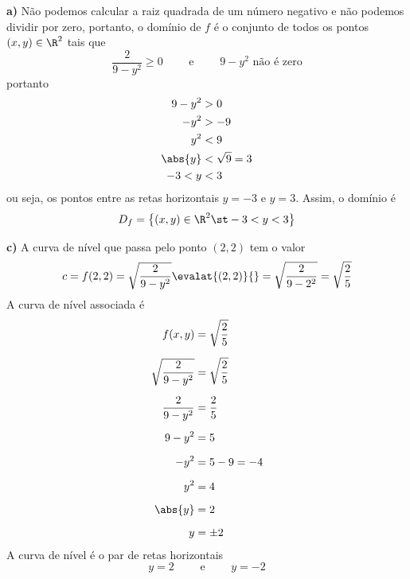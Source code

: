 \documentclass[a4paper,12pt,fleqn]{article}
\begin{document}
\begin{answer}
  \textbf{a)} \quad
  Não podemos calcular a raiz quadrada de um número negativo e não
  podemos dividir por zero, portanto, o domínio de $f$ é o conjunto
  de todos os pontos \((x, y)\in\R^2\) tais que
  \[
    \frac{2}{9 - y^2} \geq 0 \qquad\text{ e }\qquad 9 - y^2 \text{ não é zero}
  \]
  portanto
  \begin{align*}
    9 - y^2 & > 0            \\
    -y^2    & > -9           \\
    y^2     & < 9            \\
    \abs{y} & < \sqrt{9} = 3 \\
    -3 < y  & < 3
  \end{align*}
  ou seja, os pontos entre as retas horizontais \(y=-3\) e \(y=3\).
  Assim, o domínio é
  \[
    D_f = \left\{(x, y) \in \R^2 \st -3 < y < 3 \right\}
  \]

  \bigskip
  \textbf{c)} \quad
  A curva de nível que passa pelo ponto $(2, 2)$ tem o valor
  \[
    c
    = f(2, 2)
    = \sqrt{\frac{2}{9 - y^2}} \evalat{(2, 2)}{}
    = \sqrt{\frac{2}{9 - 2^2}}
    = \sqrt{\frac{2}{5}}
  \]
  A curva de nível associada é
  \begin{align*}
    f(x, y)                  & = \sqrt{\frac{2}{5}} \\[2mm]
    \sqrt{\frac{2}{9 - y^2}} & = \sqrt{\frac{2}{5}} \\[2mm]
    \frac{2}{9 - y^2}        & = \frac{2}{5}        \\[2mm]
    9 - y^2                  & = 5                  \\[2mm]
    - y^2                    & = 5 - 9 = -4         \\[2mm]
    y^2                      & = 4                  \\[2mm]
    \abs{y}                  & = 2                  \\[2mm]
    y                        & = \pm 2
  \end{align*}
  A curva de nível é o par de retas horizontais
  \[
    y = 2
    \qquad\text{ e }\qquad
    y = -2
  \]

\end{answer}

\end{document}
